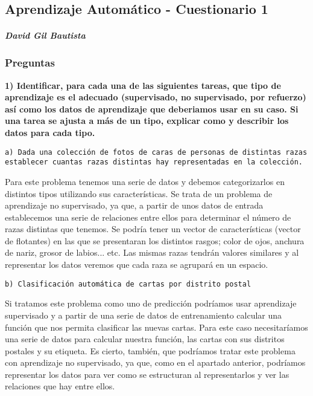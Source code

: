 \documentclass[]{article}
\date{}
\let\oldsubparagraph\subparagraph
\renewcommand{\subparagraph}[1]{\oldsubparagraph{#1}\mbox{}}
\begin{document}
\hypertarget{header-n0}{%
\subsection{Aprendizaje Automático - Cuestionario 1}\label{header-n0}}

\hypertarget{header-n2}{%
\subparagraph{David Gil Bautista}\label{header-n2}}

\hypertarget{header-n3}{%
\subsubsection{Preguntas}\label{header-n3}}

\textbf{1) Identificar, para cada una de las siguientes tareas, que tipo
de aprendizaje es el adecuado (supervisado, no supervisado, por
refuerzo) así como los datos de aprendizaje que deberiamos usar en su
caso. Si una tarea se ajusta a más de un tipo, explicar como y describir
los datos para cada tipo.}

\begin{verbatim}
a) Dada una colección de fotos de caras de personas de distintas razas establecer cuantas razas distintas hay representadas en la colección.
\end{verbatim}

Para este problema tenemos una serie de datos y debemos categorizarlos
en distintos tipos utilizando sus características. Se trata de un
problema de aprendizaje no supervisado, ya que, a partir de unos datos
de entrada establecemos una serie de relaciones entre ellos para
determinar el número de razas distintas que tenemos. Se podría tener un
vector de características (vector de flotantes) en las que se
presentaran los distintos rasgos; color de ojos, anchura de nariz,
grosor de labios... etc. Las mismas razas tendrán valores similares y al
representar los datos veremos que cada raza se agrupará en un espacio.

\begin{verbatim}
b) Clasificación automática de cartas por distrito postal
\end{verbatim}

Si tratamos este problema como uno de predicción podríamos usar
aprendizaje supervisado y a partir de una serie de datos de
entrenamiento calcular una función que nos permita clasificar las nuevas
cartas. Para este caso necesitaríamos una serie de datos para calcular
nuestra función, las cartas con sus distritos postales y su etiqueta. Es
cierto, también, que podríamos tratar este problema con aprendizaje no
supervisado, ya que, como en el apartado anterior, podríamos representar
los datos para ver como se estructuran al representarlos y ver las
relaciones que hay entre ellos.
\end{document}

